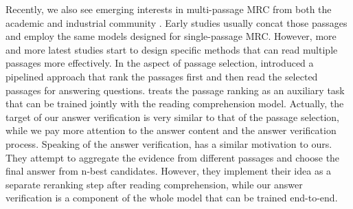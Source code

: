 
Recently, we also see emerging interests in multi-passage MRC from both the academic \cite{searchqa, triviaqa} and industrial community \cite{marco, dureader}. Early studies \cite{reasonet, rnet} usually concat those passages and employ the same models designed for single-passage MRC. However, more and more latest studies start to design specific methods that can read multiple passages more effectively. In the aspect of passage selection,  introduced a pipelined approach that rank the passages first and then read the selected passages for answering questions.   treats the passage ranking as an auxiliary task that can be trained jointly with the reading comprehension model. Actually, the target of our answer verification is very similar to that of the passage selection, while we pay more attention to the answer content and the answer verification process. Speaking of the answer verification,  has a similar motivation to ours. They attempt to aggregate the evidence from different passages and choose the final answer from n-best candidates. However, they implement their idea as a separate reranking step after reading comprehension, while our answer verification is a component of the whole model that can be trained end-to-end. 

 
